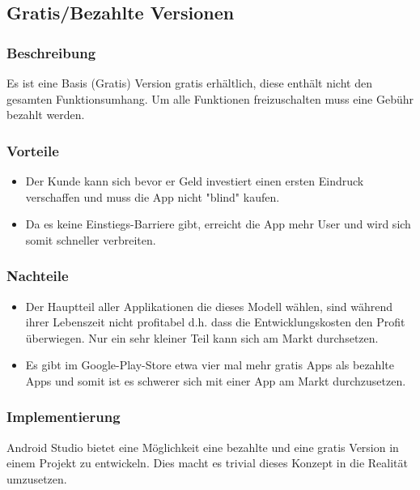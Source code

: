\documentclass[FIPLY_base.tex]{subfiles}
\begin{document}
\subsection{Gratis/Bezahlte Versionen}


\subsubsection{Beschreibung}
Es ist eine Basis (Gratis) Version gratis erhältlich, diese enthält nicht den gesamten Funktionsumhang.
Um alle Funktionen freizuschalten muss eine Gebühr bezahlt werden.

\subsubsection{Vorteile}
\begin{itemize}
\item Der Kunde kann sich bevor er Geld investiert einen ersten Eindruck verschaffen und muss die App nicht "blind" kaufen.
\item Da es keine Einstiegs-Barriere gibt, erreicht die App mehr User und wird sich somit schneller verbreiten.
\end{itemize}

\subsubsection{Nachteile}
\begin{itemize}
\item Der Hauptteil aller Applikationen die dieses Modell wählen, sind während ihrer Lebenszeit nicht profitabel d.h. dass die Entwicklungskosten den Profit überwiegen. Nur ein sehr kleiner Teil kann sich am Markt durchsetzen.
\item Es gibt im Google-Play-Store etwa vier mal mehr gratis Apps als bezahlte Apps und somit ist es schwerer sich mit einer App am Markt durchzusetzen.
\end{itemize}

\subsubsection{Implementierung}

Android Studio bietet eine Möglichkeit eine bezahlte und eine gratis Version in einem Projekt zu entwickeln.
Dies macht es trivial dieses Konzept in die Realität umzusetzen.
\end{document}

